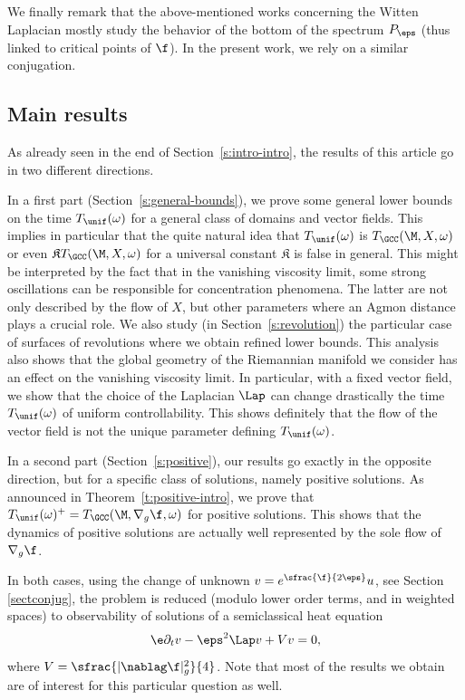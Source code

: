We finally remark that the above-mentioned works concerning the Witten Laplacian mostly study the behavior of the bottom of the spectrum $P_\eps$ (thus linked to critical points of $\f$).
In the present work, we rely on a similar conjugation.

\subsection{Main results}
\label{s:main-res}
As already seen in the end of Section~\ref{s:intro-intro}, the results of this article go in two different directions.

In a first part (Section~\ref{s:general-bounds}), we prove some general lower bounds on the time $T_{\unif}(\omega)$ for a general class of domains and vector fields. This implies in particular that the quite natural idea that $T_{\unif}(\omega)$ is $T_{\GCC}(\M,X,\omega)$ or even $\mathfrak{K}T_{\GCC}(\M,X,\omega)$ for a universal constant $\mathfrak{K}$ is false in general. This might be interpreted by the fact that in the vanishing viscosity limit, some strong oscillations can be responsible for concentration phenomena. The latter are not only described by the flow of $X$, but other parameters where an Agmon distance plays a crucial role. We also study (in Section~\ref{s:revolution}) the particular case of surfaces of revolutions where we obtain refined lower bounds. This analysis also shows that the global geometry of the Riemannian manifold we consider has an effect on the vanishing viscosity limit. In particular, with a fixed vector field, we show that the choice of the Laplacian $\Lap$ can change drastically the time $T_{\unif}(\omega)$ of uniform controllability. This shows definitely that the flow of the vector field is not the unique parameter defining $T_{\unif}(\omega)$.

In a second part (Section~\ref{s:positive}), our results go exactly in the opposite direction, but for a specific class of solutions, namely positive solutions. As announced in Theorem~\ref{t:positive-intro}, we prove that $T_{\unif}(\omega)^+=T_{\GCC}(\M,\nabla_g\f,\omega)$ for positive solutions.
This shows that the dynamics of positive solutions are actually well represented by the sole flow of~$\nabla_g\f$.

In both cases, using the change of unknown $v= e^{\sfrac{\f}{2\eps}} u$, see Section \ref{sectconjug}, the problem is reduced (modulo lower order terms, and in weighted spaces) to observability of solutions of a semiclassical heat equation
\[
\e\partial_t v- \eps^2 \Lap v+Vv =0,
\]
where $V= \sfrac{|\nablag \f|_g^2}{4}$. Note that most of the results we obtain are of interest for this particular question as well.

